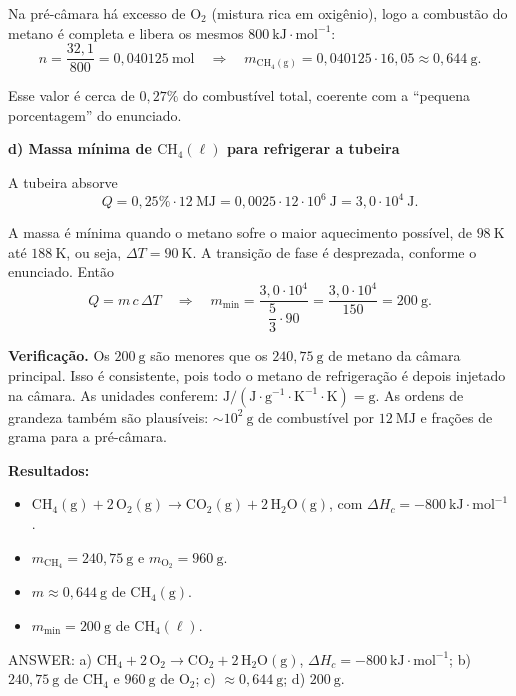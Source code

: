 \documentclass{article}%
\begin{document}
Na pré-câmara há excesso de $\mathrm{O_2}$ (mistura rica em oxigênio), logo a combustão do metano é completa e libera os mesmos $800\ \mathrm{kJ\cdot mol^{-1}}$:
\[
n = \frac{32{,}1}{800} = 0{,}040125\ \mathrm{mol}
\quad\Rightarrow\quad
m_{\mathrm{CH_4(g)}} = 0{,}040125\cdot 16{,}05 \approx 0{,}644\ \mathrm{g}.
\]

Esse valor é cerca de $0{,}27\%$ do combustível total, coerente com a ``pequena porcentagem'' do enunciado.

\textbf{d) Massa mínima de $\mathrm{CH_4(\ell)}$ para refrigerar a tubeira}

A tubeira absorve
\[
Q = 0{,}25\% \cdot 12\ \mathrm{MJ} = 0{,}0025\cdot 12\cdot 10^{6}\ \mathrm{J} = 3{,}0\cdot 10^{4}\ \mathrm{J}.
\]

A massa é mínima quando o metano sofre o maior aquecimento possível, de $98\ \mathrm{K}$ até $188\ \mathrm{K}$, ou seja, $\Delta T = 90\ \mathrm{K}$. A transição de fase é desprezada, conforme o enunciado. Então
\[
Q = m\,c\,\Delta T
\quad\Rightarrow\quad
m_{\min} = \frac{3{,}0\cdot 10^{4}}{\dfrac{5}{3}\cdot 90} = \frac{3{,}0\cdot 10^{4}}{150} = 200\ \mathrm{g}.
\]

\textbf{Verificação.} Os $200\ \mathrm{g}$ são menores que os $240{,}75\ \mathrm{g}$ de metano da câmara principal. Isso é consistente, pois todo o metano de refrigeração é depois injetado na câmara. As unidades conferem: $\mathrm{J}/(\mathrm{J\cdot g^{-1}\cdot K^{-1}\cdot K}) = \mathrm{g}$. As ordens de grandeza também são plausíveis: $\sim 10^{2}\ \mathrm{g}$ de combustível por $12\ \mathrm{MJ}$ e frações de grama para a pré-câmara.

\textbf{Resultados:}
\begin{itemize}
\item[a)] $\mathrm{CH_4(g) + 2\,O_2(g) \rightarrow CO_2(g) + 2\,H_2O(g)}$, com $\Delta H_c = -800\ \mathrm{kJ\cdot mol^{-1}}$.
\item[b)] $m_{\mathrm{CH_4}} = 240{,}75\ \mathrm{g}$ e $m_{\mathrm{O_2}} = 960\ \mathrm{g}$.
\item[c)] $m \approx 0{,}644\ \mathrm{g}$ de $\mathrm{CH_4(g)}$.
\item[d)] $m_{\min} = 200\ \mathrm{g}$ de $\mathrm{CH_4(\ell)}$.
\end{itemize}

ANSWER: a) $\mathrm{CH_4 + 2\,O_2 \rightarrow CO_2 + 2\,H_2O(g)}$, $\Delta H_c = -800\ \mathrm{kJ\cdot mol^{-1}}$; b) $240{,}75\ \mathrm{g}$ de $\mathrm{CH_4}$ e $960\ \mathrm{g}$ de $\mathrm{O_2}$; c) $\approx 0{,}644\ \mathrm{g}$; d) $200\ \mathrm{g}$.%
\newpage%
\end{document}
